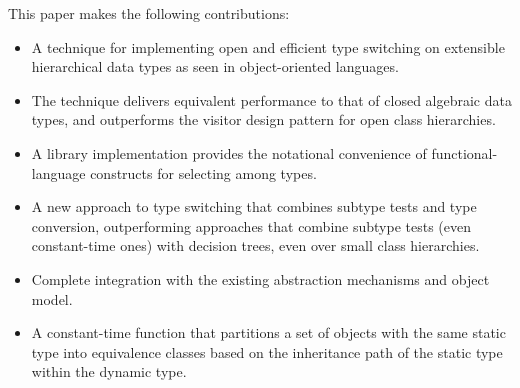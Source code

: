 This paper makes the following contributions:
%
  \begin{itemize}
  \setlength{\itemsep}{0pt}
  \setlength{\parskip}{0pt}
  \item A technique for implementing open and efficient type 
        switching on extensible hierarchical data types as seen in 
        object-oriented languages.
  \item The technique delivers equivalent performance to that 
        of closed algebraic data types, and outperforms the visitor design pattern for open class hierarchies.
  \item A library implementation provides the notational convenience of
        functional-language constructs for selecting among types.
  \item A new approach to type switching that combines subtype tests and type 
        conversion, outperforming approaches that 
        combine subtype tests (even constant-time ones) with decision trees, even over
        small class hierarchies. 
  \item Complete integration with the existing \Cpp{} abstraction mechanisms and 
        object model.
  \item A constant-time function that partitions 
        a set of objects with the same static type into equivalence classes 
        based on the inheritance path of the static type within the dynamic type.
  \end{itemize}

